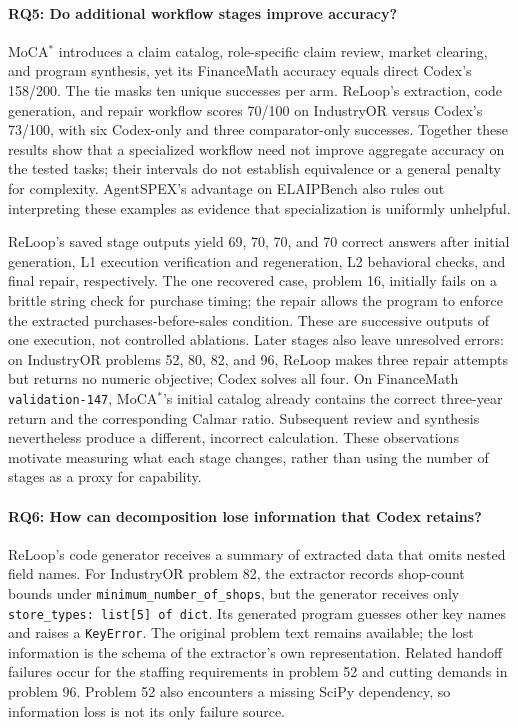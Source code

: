 \paragraph{RQ5: Do additional workflow stages improve accuracy?}
MoCA$^*$ introduces a claim catalog, role-specific claim review, market clearing, and program
synthesis, yet its FinanceMath accuracy equals direct Codex's 158/200. The tie masks ten unique
successes per arm. ReLoop's extraction, code generation, and repair workflow scores 70/100 on
IndustryOR versus Codex's 73/100, with six Codex-only and three comparator-only successes.
Together these results show that a specialized workflow need not improve aggregate accuracy
on the tested tasks; their intervals do not establish equivalence or a general penalty for
complexity. AgentSPEX's advantage on ELAIPBench also rules out interpreting these examples as
evidence that specialization is uniformly unhelpful.

ReLoop's saved stage outputs yield 69, 70, 70, and 70 correct answers after initial generation,
L1 execution verification and regeneration, L2 behavioral checks, and final repair, respectively.
The one recovered case, problem 16, initially
fails on a brittle string check for purchase timing; the repair allows the program to enforce
the extracted purchases-before-sales condition. These are successive outputs of one execution,
not controlled ablations. Later stages also leave unresolved errors: on IndustryOR
problems 52, 80, 82, and 96, ReLoop makes three repair attempts but returns no numeric objective;
Codex solves all four. On FinanceMath \texttt{validation-147}, MoCA$^*$'s initial catalog already
contains the correct three-year return and the corresponding Calmar ratio. Subsequent review
and synthesis nevertheless produce a different, incorrect calculation. These observations
motivate measuring what each stage changes, rather than using the number of stages as a proxy
for capability. 

\paragraph{RQ6: How can decomposition lose information that Codex retains?}
ReLoop's code generator receives a summary of extracted data that omits nested field names.
For IndustryOR problem 82, the extractor records shop-count bounds under
\texttt{minimum\_number\_of\_shops}, but the generator receives only
\texttt{store\_types: list[5] of dict}. Its generated program guesses other key names and
raises a \texttt{KeyError}. The original problem text remains available; the lost information
is the schema of the extractor's own representation. Related handoff failures occur for the
staffing requirements in problem 52 and cutting demands in problem 96. Problem 52 also encounters
a missing SciPy dependency, so information loss is not its only failure source.

